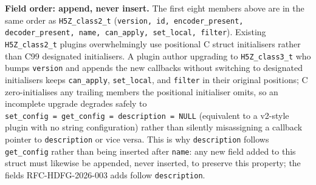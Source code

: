 \documentclass[../RFC-HDFG-2026-001.tex]{subfiles}
\begin{document}
\textbf{Field order: append, never insert.}  The first eight members
above are in the same order as \texttt{H5Z\_class2\_t}
(\texttt{version, id, encoder\_present, decoder\_present, name,
can\_apply, set\_local, filter}).  Existing \texttt{H5Z\_class2\_t}
plugins overwhelmingly use positional C struct initialisers rather than
C99 designated initialisers.  A plugin author upgrading to
\texttt{H5Z\_class3\_t} who bumps \texttt{version} and appends the new
callbacks without switching to designated initialisers keeps
\texttt{can\_apply}, \texttt{set\_local}, and \texttt{filter} in their
original positions; C zero-initialises any trailing members the
positional initialiser omits, so an incomplete upgrade degrades safely
to \texttt{set\_config~=~get\_config~=~description~=~NULL} (equivalent
to a v2-style plugin with no string configuration) rather than silently
misassigning a callback pointer to \texttt{description} or vice versa.
This is why \texttt{description} follows \texttt{get\_config} rather than
being inserted after \texttt{name}: any new field added to this struct
must likewise be appended, never inserted, to preserve this property;
the fields RFC-HDFG-2026-003 adds follow \texttt{description}.

\end{document}
